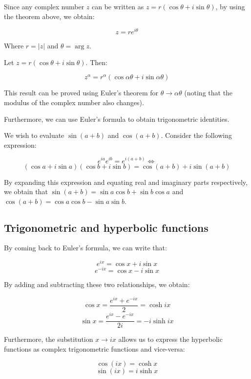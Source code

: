 \documentclass[12pt]{article}
\begin{document}
Since any complex number $z$ can be written as $z = r(\cos{\theta} + i\sin{\theta})$, by using the theorem above, we obtain:

\[ z = re^{i\theta} \]

Where $r = |z|$ and $\theta = \arg{z}$.

\begin{proposition}
    Let $z = r(\cos{\theta} + i\sin{\theta})$. Then:

    \[ z^\alpha = r^\alpha(\cos{\alpha\theta} + i\sin{\alpha\theta}) \]
\end{proposition}

This result can be proved using Euler's theorem for $\theta \to \alpha\theta$ (noting that the modulus of the complex number also changes).

Furthermore, we can use Euler's formula to obtain trigonometric identities.

\begin{example}
    We wish to evaluate $\sin{(a + b)}$ and $\cos{(a + b)}$. Consider the following expression:

    \[ e^{ia}e^{ib} = e^{i(a + b)} \Leftrightarrow \]
    \[ (\cos{a} + i\sin{a})(\cos{b} + i\sin{b}) = \cos{(a+b)} + i\sin{(a + b)} \]

    By expanding this expression and equating real and imaginary parts respectively, we obtain that $\sin{(a + b)} = \sin{a}\cos{b} + \sin{b}\cos{a}$ and $\cos{(a + b)} = \cos{a}\cos{b} - \sin{a}\sin{b}$.
\end{example}

\newpage

\subsection{Trigonometric and hyperbolic functions}

By coming back to Euler's formula, we can write that:

\[ e^{ix} = \cos{x} + i\sin{x} \]
\[ e^{-ix} = \cos{x} - i\sin{x} \]

By adding and subtracting these two relationships, we obtain:

\[ \cos{x} = \frac{e^{ix} + e^{-ix}}{2} = \cosh{ix} \]
\[ \sin{x} = \frac{e^{ix} - e^{-ix}}{2i} = -i\sinh{ix}\]

Furthermore, the substitution $x \to ix$ allows us to express the hyperbolic functions as complex trigonometric functions and vice-versa:

\[ \cos{(ix)} = \cosh{x} \]
\[ \sin{(ix)} = i\sinh{x} \]
\end{document}
